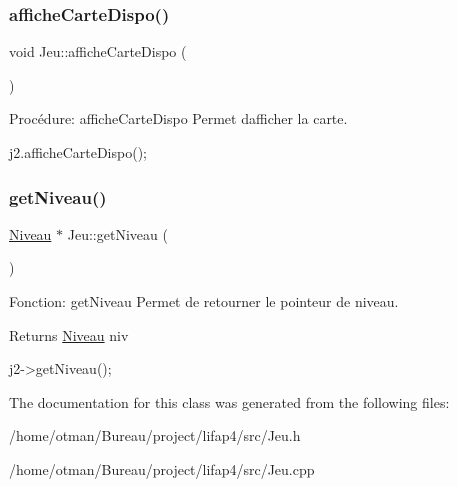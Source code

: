 \subsubsection{\texorpdfstring{affiche\+Carte\+Dispo()}{afficheCarteDispo()}}
{\footnotesize\ttfamily void Jeu\+::affiche\+Carte\+Dispo (\begin{DoxyParamCaption}{ }\end{DoxyParamCaption})}



Procédure\+: affiche\+Carte\+Dispo Permet d\textquotesingle{}afficher la carte. 


\begin{DoxyCode}
j2.afficheCarteDispo();
\end{DoxyCode}
 \mbox{\label{classJeu_a71bf0b5329ade330d95318b50d1e2f12}} 
\subsubsection{\texorpdfstring{get\+Niveau()}{getNiveau()}}
{\footnotesize\ttfamily \hyperlink{classNiveau}{Niveau} $\ast$ Jeu\+::get\+Niveau (\begin{DoxyParamCaption}{ }\end{DoxyParamCaption})}



Fonction\+: get\+Niveau Permet de retourner le pointeur de niveau. 

\begin{DoxyReturn}{Returns}
\hyperlink{classNiveau}{Niveau} niv 
\begin{DoxyCode}
j2->getNiveau();
\end{DoxyCode}
 
\end{DoxyReturn}


The documentation for this class was generated from the following files\+:\begin{DoxyCompactItemize}
\item 
/home/otman/\+Bureau/project/lifap4/src/Jeu.\+h\item 
/home/otman/\+Bureau/project/lifap4/src/Jeu.\+cpp\end{DoxyCompactItemize}

